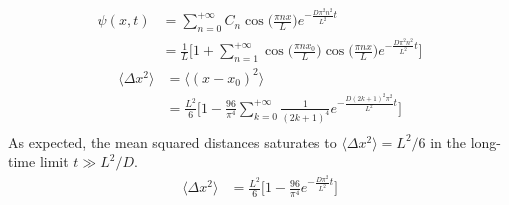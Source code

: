 \begin{align*}
  \psi(x,t) &= \sum_{n=0}^{+\infty} C_n \cos\Big(\frac{\pi n x}{L}\Big) e^{- \frac{D\pi^2
  n^2}{L^2}t}\\
            &=\frac{1}{L} \Bigg[ 1 + \sum_{n=1}^{+\infty} \cos\Big(\frac{\pi n
  x_0}{L}\Big) \cos\Big(\frac{\pi n x}{L}\Big) e^{- \frac{D\pi^2  n^2}{L^2}t}\Bigg]
\end{align*}
\begin{align*}
  \langle \Delta x^2 \rangle &= \langle(x-x_0)^2\rangle\\&= \frac{L^2}{6}\Bigg[1 -
  \frac{96}{\pi^4}
  \sum_{k=0}^{+\infty} \frac{1}{(2k+1)^4} e^{- \frac{D(2k+1)^2 \pi^2}{L^2}t}\Bigg]\\
\end{align*}
As expected, the mean squared distances saturates to $\langle \Delta x^2 \rangle = L^2/6$
in the long-time limit $t \gg L^2 / D.$
\begin{align*}
  \langle \Delta x^2 \rangle &= \frac{L^2}{6}\Bigg[1 -
  \frac{96}{\pi^4} e^{- \frac{D \pi^2}{L^2}t}\Bigg]\\
\end{align*}

